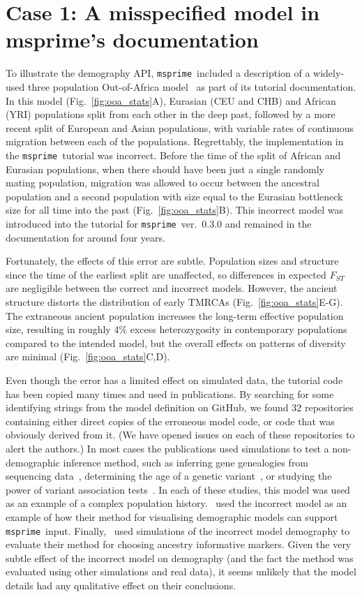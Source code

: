 \documentclass{article}
\newcommand{\msprime}[0]{\texttt{msprime}}
\begin{document}
\section*{Case 1: A misspecified model in msprime's documentation}

To illustrate the demography API, \msprime\ included a description of a widely-used
three population Out-of-Africa model~\citep{gutenkunst2009inferring}
as part of its tutorial documentation. In this model (Fig.~\ref{fig:ooa_stats}A),
Eurasian (CEU and CHB) and African (YRI) populations split from each other in the deep past,
followed by a more recent split of European and Asian populations, with variable rates of
continuous migration between each of the populations. Regrettably, the implementation in the
\msprime\ tutorial was incorrect. Before the time of the split of African and Eurasian
populations, when there should have been just a single randomly mating population, migration was
allowed to occur between the ancestral population and a second population with size equal to
the Eurasian bottleneck size for all time into the past
(Fig.~\ref{fig:ooa_stats}B). This incorrect model was introduced into
the tutorial for \msprime~ver.~0.3.0 and remained in the documentation for
around four years.

Fortunately, the effects of this error are subtle.
Population sizes and structure since the time of
the earliest split are unaffected, so differences in expected $F_{ST}$ are negligible between
the correct and incorrect models. However, the ancient structure distorts the distribution
of early TMRCAs (Fig.~\ref{fig:ooa_stats}E-G).
The extraneous ancient population increases the long-term effective
population size, resulting in roughly $4\%$ excess heterozygosity in
contemporary populations compared to the intended model, but the overall effects
on patterns of diversity are minimal (Fig.~\ref{fig:ooa_stats}C,D).

Even though the error has a limited effect on simulated data, the tutorial code has been
copied many times and used in publications. By searching for some identifying strings
from the model definition on GitHub,
we found 32 repositories containing either direct copies of the
erroneous model code, or code that was obviously derived from it.
(We have opened issues on each of these repositories to alert the authors.)
In most cases the publications used simulations to test a non-demographic inference
method, such as inferring gene genealogies from sequencing data~\citep{kelleher2019inferring},
determining the age of a genetic variant~\citep{albers2020dating},
or studying the power of variant association tests~\citep{tong2020population}.
In each of these studies, this model was used as an example of a complex population history.
\citet{zhou2018popdemog}~used the incorrect model as an example
of how their method for visualising demographic models can support
\msprime\ input.
Finally, \citet{pfaffelhuber2020choose}~used simulations
of the incorrect model demography to evaluate
their method for choosing ancestry informative markers.
Given the very subtle effect of the incorrect
model on demography (and the fact the method was evaluated using other
simulations and real data), it seems unlikely that the model details
had any qualitative effect on their conclusions.
\end{document}
